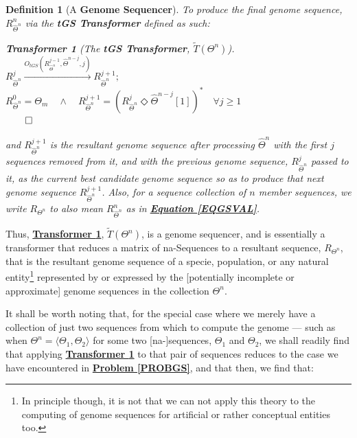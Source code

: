 \documentclass[a4paper, 18pt]{book} %
\newtheorem{defn}{Definition}
\newtheorem{transf}{Transformer}
\begin{document}
{\begin{minipage}{0.9\textwidth}
\begin{defn}[A \textbf{Genome Sequencer}]
To produce the final genome sequence, $R_{\hat{\Theta}^n}^{n}$ via the \textbf{tGS Transformer} defined as such:

\vspace{1em}
\begin{transf}[The \textbf{tGS Transformer}, $\tilde{T}(\Theta^n)$]
\label{TRANSFGENSEQ}
$ $\\
$R_{\hat{\Theta}^n}^{j}  \xrightarrow{O_{tGS}(R_{\hat{\Theta}^n}^{j-1}, \hat{\Theta}^{n-j},j)} R_{\hat{\Theta}^n}^{j+1};$\\
$R_{\hat{\Theta}^n}^{0} = \Theta_m \quad \land \quad R_{\hat{\Theta}^n}^{j+1} = ( R_{\hat{\Theta}^n}^j \Diamond \hat{\Theta}^{n-j}[1])^* \quad \forall j \geq 1$\\
$\qed$
\vspace{1em}

and $R_{\hat{\Theta}^n}^{j+1}$ is the resultant genome sequence after processing $\hat{\Theta}^n$ with the first $j$ sequences removed from it, and with the previous genome sequence, $R_{\hat{\Theta}^n}^j$ passed to it, as the current best candidate genome sequence so as to produce that next genome sequence $R_{\hat{\Theta}^n}^{j+1}$. Also, for a sequence collection of $n$ member sequences, we write $R_{\Theta^n}$ to also mean $R_{\hat{\Theta}^n}^{n}$ as in \textbf{\hyperref[EQGSVAL]{Equation \ref{EQGSVAL}}}.
\end{transf} 
\vspace{1em}

\end{defn}
\end{minipage}}
\vspace{2em}

Thus, \textbf{\hyperref[TRANSFGENSEQ]{Transformer \ref{TRANSFGENSEQ}}}, $\tilde{T}(\Theta^n)$, is a genome sequencer, and is essentially a transformer that reduces a matrix of na-Sequences to a resultant sequence, $R_{\Theta^n}$, that is the resultant genome sequence of a specie, population, or any natural entity\footnote{In principle though, it is not that we can not apply this theory to the computing of genome sequences for artificial or rather conceptual entities too.} represented by or expressed by the [potentially incomplete or approximate] genome sequences in the collection $\Theta^n$.

It shall be worth noting that, for the special case where we merely have a collection of just two sequences from which to compute the genome --- such as when $\Theta^n = \langle \Theta_1, \Theta_2 \rangle $ for some two [na-]sequences, $\Theta_1$ and $\Theta_2$, we shall readily find that applying \textbf{\hyperref[TRANSFGENSEQ]{Transformer \ref{TRANSFGENSEQ}}} to that pair of sequences reduces to the case we have encountered in \textbf{\hyperref[PROBGS]{Problem \ref{PROBGS}}}, and that then, we find that:
\end{document}
